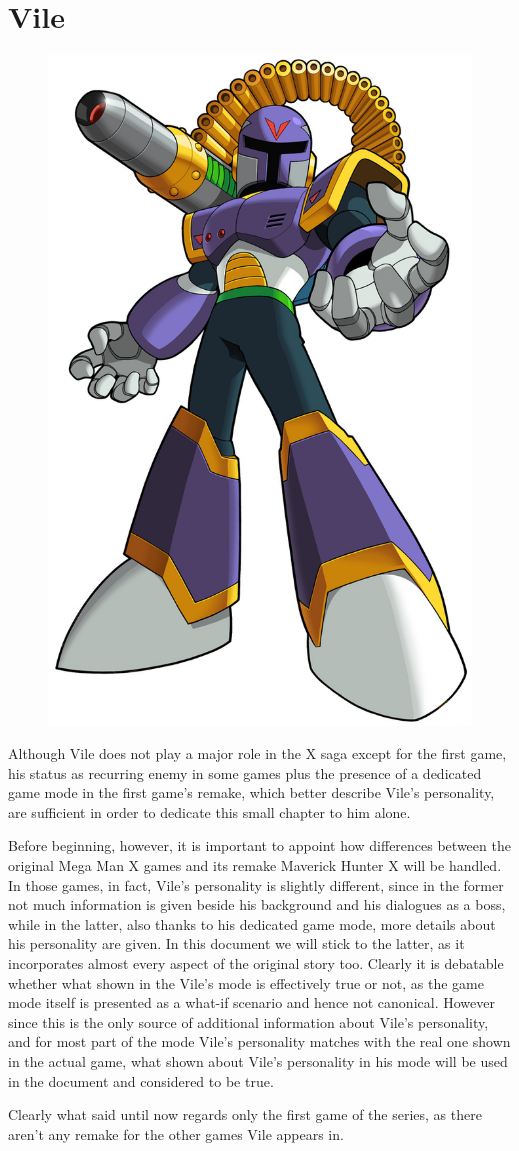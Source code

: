 \chapter{Vile}\label{char:Vile}
\begin{figure}[h]
	\centering
	\includegraphics[width=0.3\linewidth]{figures/X1/Sigma_stages/MhxVile.png}	
\end{figure}

Although Vile does not play a major role in the X saga except for the first game, his status as recurring enemy in some games plus the presence of a dedicated game mode in the first game's remake, which better describe Vile's personality, are sufficient in order to dedicate this small chapter to him alone. 

Before beginning, however, it is important to appoint how differences between the original Mega Man X games and its remake Maverick Hunter X will be handled. In those games, in fact, Vile's personality is slightly different, since in the former not much information is given beside his background and his dialogues as a boss, while in the latter, also thanks to his dedicated game mode, more details about his personality are given. In this document we will stick to the latter, as it incorporates almost every aspect of the original story too. Clearly it is debatable whether what shown in the Vile's mode is effectively true or not, as the game mode itself is presented as a what-if scenario and hence not canonical. However since this is the only source of additional information about Vile's personality, and for most part of the mode Vile's personality matches with the real one shown in the actual game, what shown about Vile's personality in his mode will be used in the document and considered to be true.

Clearly what said until now regards only the first game of the series, as there aren't any remake for the other games Vile appears in.

